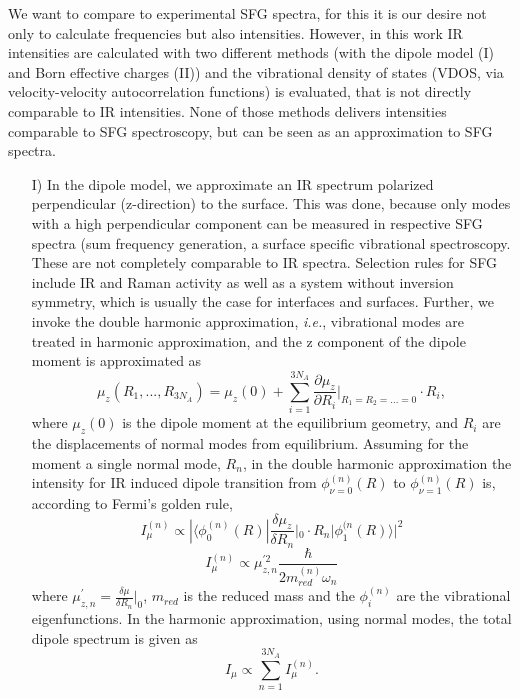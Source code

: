 \documentclass[11pt,DIV=13,BCOR=5mm,a4paper,headinclude]{scrbook}
\begin{document}
We want to compare to experimental SFG spectra, for this it is our desire not only to calculate frequencies but also intensities.
However, in this work IR intensities are calculated with two different methods (with the dipole model (I) and Born effective charges (II)) and the vibrational density of states (VDOS, via velocity-velocity autocorrelation functions) is evaluated, that is not directly comparable to IR intensities.
None of those methods delivers intensities comparable to SFG spectroscopy, but can be seen as an approximation to SFG spectra.


\begin{itemize}
 \item[I)]
 In the dipole model, we approximate an IR spectrum polarized perpendicular (z-direction) to the surface.
This was done, because only modes with a high perpendicular component can be measured in respective SFG spectra (sum frequency generation, a surface specific vibrational spectroscopy. %
These are not completely comparable to IR spectra.
Selection rules for SFG include IR and Raman activity as well as a system without inversion symmetry, which is usually the case for interfaces and surfaces.
 Further, we invoke the double harmonic approximation, \textit{i.e.}, vibrational modes are treated in harmonic approximation, and the z component of the dipole moment is approximated as
 \begin{equation}
  \mu_z(R_1,...,R_{3N_A})=\mu_z(0) + \sum_{i=1}^{3N_A}\frac{\partial \mu_z}{\partial R_i}|_{R_1=R_2=...=0}\cdot R_i ,
 \end{equation}
 where $\mu_z(0)$ is the dipole moment at the equilibrium geometry, and $R_i$ are the displacements of normal modes from equilibrium.
Assuming for the moment a single normal mode, $R_n$, in the double harmonic approximation the intensity for IR induced dipole transition from $\phi_{\nu=0}^{(n)}(R)$ to $\phi_{\nu=1}^{(n)}(R)$ is, according to Fermi's golden rule,
\begin{equation}
I_\mu^{(n)}\propto |\langle \phi_0^{(n)}(R)|\frac{\delta \mu_z}{\delta R_n}|_0\cdot R_n|\phi_1^{(n}(R) \rangle|^2
\end{equation}
\begin{equation}\label{eq:mu-int}
I_\mu^{(n)}\propto \mu_{z,n}^{\prime 2} \frac{\hbar}{2m_{red}^{(n)}\omega_n}
\end{equation}
where $\mu_{z,n}^{\prime}=\frac{\delta \mu}{\delta R_n}|_0$, $m_{red}$ is the reduced mass and the $\phi_i^{(n)}$ are the vibrational eigenfunctions.
In the harmonic approximation, using normal modes, the total dipole spectrum is given as 
\begin{equation}
I_\mu \propto \sum_{n=1}^{3N_A}I_{\mu}^{(n)}.
\end{equation}



\end{itemize}
\end{document}
